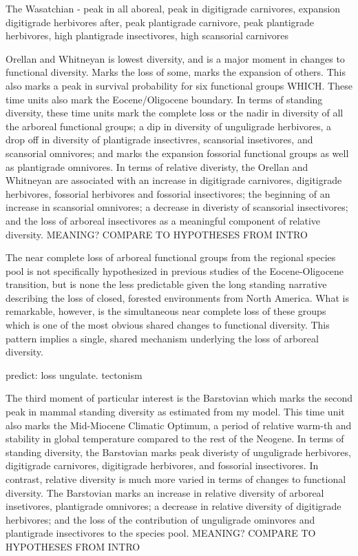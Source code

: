 \documentclass[12pt,letterpaper]{article}
\begin{document}
The Wasatchian
- peak in all aboreal, peak in digitigrade carnivores, expansion digitigrade herbivores after, peak plantigrade carnivore, peak plantigrade herbivores, high plantigrade insectivores, high scansorial carnivores

Orellan and Whitneyan is lowest diversity, and is a major moment in changes to functional diversity. Marks the loss of some, marks the expansion of others. This also marks a peak in survival probability for six functional groups WHICH. These time units also mark the Eocene/Oligocene boundary. In terms of standing diversity, these time units mark the complete loss or the nadir in diversity of all the arboreal functional groups; a dip in diversity of unguligrade herbivores, a drop off in diversity of plantigrade insectivres, scansorial insetivores, and scansorial omnivores; and marks the expansion fossorial functional groups as well as plantigrade omnivores. In terms of relative diveristy, the Orellan and Whitneyan are associated with an increase in digitigrade carnivores, digitigrade herbivores, fossorial herbivores and fossorial insectivores; the beginning of an increase in scansorial omnivores; a decrease in diveristy of scansorial insectivores; and the loss of arboreal insectivores as a meaningful component of relative diversity. \uppercase{meaning? compare to hypotheses from intro}

The near complete loss of arboreal functional groups from the regional species pool is not specifically hypothesized in previous studies of the Eocene-Oligocene transition, but is none the less predictable given the long standing narrative describing the loss of closed, forested environments from North America. What is remarkable, however, is the simultaneous near complete loss of these groups which is one of the most obvious shared changes to functional diversity. This pattern implies a single, shared mechanism underlying the loss of arboreal diversity.

predict: loss ungulate. tectonism




The third moment of particular interest is the Barstovian which marks the second peak in mammal standing diversity as estimated from my model. This time unit also marks the Mid-Miocene Climatic Optimum, a period of relative warm-th and stability in global temperature compared to the rest of the Neogene. In terms of standing diversity, the Barstovian marks peak diveristy of unguligrade herbivores, digitigrade carnivores, digitigrade herbivores, and fossorial insectivores. In contrast, relative diversity is much more varied in terms of changes to functional diversity. The Barstovian marks an increase in relative diversity of arboreal insetivores, plantigrade omnivores; a decrease in relative diversity of digitigrade herbivores; and the loss of the contribution of unguligrade ominvores and plantigrade insectivores to the species pool. \uppercase{meaning? compare to hypotheses from intro}
\end{document}
